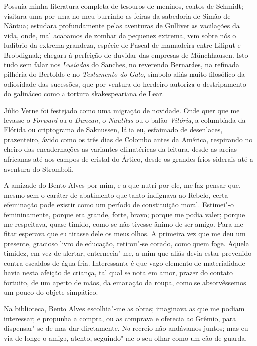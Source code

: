 Possuía minha literatura completa de tesouros de meninos, contos de
Schmidt; visitara uma por uma no meu burrinho as feiras da sabedoria de
Simão de Nântua; estudara profundamente pelas aventuras de Gulliver as
vacilações da vida, onde, mal acabamos de zombar da pequenez extrema,
vem sobre nós o ludíbrio da extrema grandeza, espécie de Pascal de
mamadeira entre Liliput e Brobdignak; chegara à perfeição de duvidar
das empresas de Münchhausen. Isto tudo sem falar nos \textit{Lusíadas} do
Sanches, no reverendo Bernardes, na refinada pilhéria do Bertoldo e no
\textit{Testamento do Galo}, símbolo aliás muito filosófico da odiosidade das
sucessões, que por ventura do herdeiro autoriza o destripamento do
galináceo como a tortura skakespeariana de Lear. 

Júlio Verne foi
festejado como uma migração de novidade. Onde quer que me levasse o
\textit{Forward} ou o \textit{Duncan}, o \textit{Nautilus} ou o balão \textit{Vitória}, a columbíada da
Flórida ou criptograma de Saknussen, lá ia eu, esfaimado de desenlaces,
prazenteiro, ávido como os três dias de Colombo antes da América,
respirando no cheiro das encadernações as variantes climatéricas da
leitura, desde as areias africanas até aos campos de cristal do Ártico,
desde os grandes frios siderais até a aventura do Stromboli. 

A amizade
do Bento Alves por mim, e a que nutri por ele, me faz pensar que, mesmo
sem o caráter de abatimento que tanto indignava ao Rebelo, certa
efeminação pode existir como um período de constituição moral.
Estimei"-o femininamente, porque era grande, forte, bravo; porque me
podia valer; porque me respeitava, quase tímido, como se não tivesse
ânimo de ser amigo. Para me fitar esperava que eu tirasse dele os meus
olhos. A primeira vez que me deu um presente, gracioso livro de
educação, retirou"-se corado, como quem foge. Aquela timidez, em vez
de alertar, enternecia"-me, a mim que aliás devia estar prevenido
contra escaldos de água fria. Interessante é que vago elemento de
materialidade havia nesta afeição de criança, tal qual se nota em amor,
prazer do contato fortuito, de um aperto de mãos, da emanação da roupa,
como se absorvêssemos um pouco do objeto simpático. 

Na biblioteca,
Bento Alves escolhia"-me as obras; imaginava as que me podiam
interessar; e propunha a compra, ou as comprava e oferecia ao Grêmio,
para dispensar"-se de mas dar diretamente. No recreio não andávamos
juntos; mas eu via de longe o amigo, atento, seguindo"-me o seu olhar
como um cão de guarda. 

